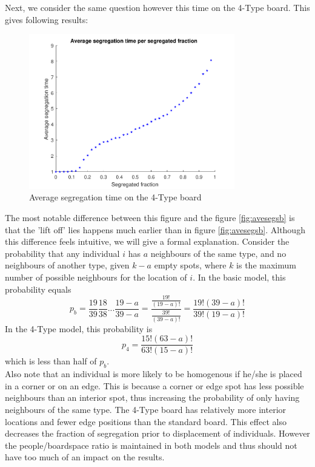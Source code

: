 Next, we consider the same question however this time on the 4-Type board. This gives  following results:


 \begin{figure}[H]
    \centering
    \includegraphics[width=0.8\textwidth]{aveseg_4b_2}
    \caption{Average segregation time on the 4-Type board}
    \label{fig:aveseg4b}
\end{figure}

The most notable difference between this figure and the figure \ref{fig:avesegsb} is that the 'lift off' lies happens much earlier than in figure \ref{fig:avesegsb}. 
Although this difference feels intuitive, we will give a formal explanation. 
Consider the probability that any individual $i$ has $a$ neighbours of the same type, and no neighbours of another type, given $k-a$ empty spots, where $k$ is the maximum number of possible neighbours for the location of $i$. 
In the basic model, this probability equals
\[
p_b = \frac{19}{39}\frac{18}{38}...\frac{19-a}{39-a} = \frac{\frac{19!}{(19-a)!}}{\frac{39!}{(39-a)!}} = \frac{19!(39-a)!}{39!(19-a)!}
\]
In the 4-Type model, this probability is
\[
p_4 = \frac{15!(63-a)!}{63!(15-a)!}
\]
which is less than half of $p_b$.\\

Also note that an individual is more likely to be homogenous if he/she is placed in a corner or on an edge. 
This is because a corner or edge spot has less possible neighbours than an interior spot, thus increasing the probability of only having neighbours of the same type. 
The 4-Type board has relatively more interior locations and fewer edge positions than the standard board. This effect also decreases the fraction of segregation prior to displacement of individuals.
However the people/boardspace ratio is maintained in both models and thus should not have too much of an impact on the results.\\

